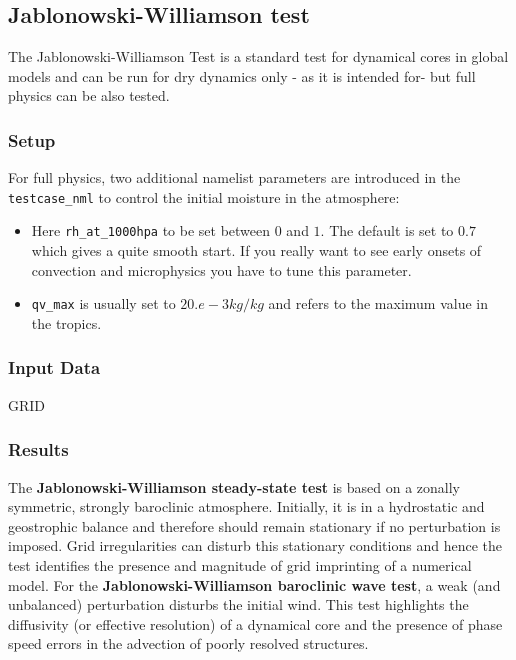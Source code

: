 \subsection{Jablonowski-Williamson test}

The Jablonowski-Williamson Test \citep{Jablonowski:2006} is a standard test for dynamical cores in global models and can be run for dry dynamics only - as it is intended for- but full physics can be also tested. 

\subsubsection{Setup}

For full physics, two additional namelist parameters are introduced in the  \verb+testcase_nml+ to control the initial moisture in the atmosphere:
\begin{itemize}
\item Here \verb+rh_at_1000hpa+ to be set between $0$ and $1$. The default is set to $0.7$ which gives a quite smooth start. If you really want to see early onsets of convection and microphysics you have to tune this parameter.
\item \verb+qv_max+ is usually set to $20.e-3 kg/kg$ and refers to the maximum value in the tropics.
\end{itemize}

\subsubsection{Input Data}

GRID

\subsubsection{Results}

The \textbf{Jablonowski-Williamson steady-state test} is based on a zonally symmetric, strongly baroclinic atmosphere. Initially, it is in a hydrostatic and geostrophic balance and therefore should remain stationary if no perturbation is imposed. Grid irregularities can disturb this stationary conditions and hence the test identifies the presence and magnitude of grid imprinting of a numerical model.
For the \textbf{Jablonowski-Williamson baroclinic wave test}, a weak (and unbalanced) perturbation disturbs the initial wind. This test highlights the diffusivity (or effective resolution) of a dynamical core and the presence of phase speed errors in the advection of poorly resolved structures.

